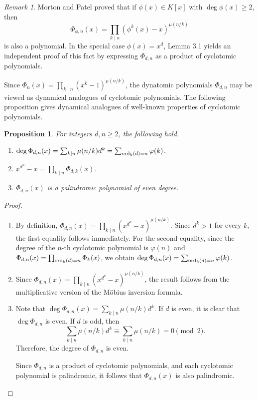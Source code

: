\documentclass[10pt,leqno]{amsart}
\newtheorem{proposition}[theorem]{Proposition}
\theoremstyle{definition}
\theoremstyle{remark}
\newtheorem{remark}[theorem]{Remark}
\numberwithin{equation}{section}
\def\ord{{\rm ord}}
\begin{document}
\begin{remark}
    Morton and Patel \cite[Theorem 2.5]{Morton94} proved that if $\phi(x)\in K[x]$ with $\deg\phi(x)\geq 2$, then 
    $$\Phi_{\phi,n}(x) = \prod_{k\mid n}(\phi^k(x)-x)^{\mu(n/k)}$$
    is also a polynomial. In the special case $\phi(x) = x^d$, Lemma 3.1 yields an independent proof of this fact by expressing $\Phi_{d,n}$ as a product of cyclotomic polynomials.
\end{remark}

Since $\Phi_n(x) = \prod_{k\mid n}(x^k-1)^{\mu(n/k)}$, the dynatomic polynomials $\Phi_{d,n}$ may be viewed as dynamical analogues of cyclotomic polynomials. The following proposition gives dynamical analogues of well-known properties of cyclotomic polynomials.

\begin{proposition}For integers $d,n\geq 2$, the following hold.
    \begin{enumerate}
        \item $\deg\Phi_{d,n}(x) = \sum_{k\mid n}\mu(n/k)d^k = \sum_{\ord_k(d) = n}\varphi(k)$.
        \item $x^{d^n}-x = \prod_{k\mid n}\Phi_{d,k}(x)$.
        \item $\Phi_{d,n}(x)$ is a palindromic polynomial of even degree.
    \end{enumerate}
\end{proposition}

\begin{proof}~
    \begin{enumerate}
        \item By definition, $\Phi_{d,n}(x) = \prod_{k\mid n}(x^{d^k}-x)^{\mu(n/k)}$. Since $d^k>1$ for every $k$, the first equality follows immediately. For the second equality, since the degree of the $n$-th cyclotomic polynomial is $\varphi(n)$ and $\Phi_{d,n}(x) = \prod_{\ord_k(d) = n}\Phi_k(x)$, we obtain $\deg \Phi_{d,n}(x) = \sum_{\ord_k(d) = n}\varphi(k)$.
        \item Since $\Phi_{d,n}(x) = \prod_{k\mid n}(x^{d^k}-x)^{\mu(n/k)}$, the result follows from the multiplicative version of the Möbius inversion formula.
        \item Note that $\deg\Phi_{d,n}(x) = \sum_{k\mid n}\mu(n/k)d^k$. If $d$ is even, it is clear that $\deg\Phi_{d,n}$ is even. If $d$ is odd, then
        $$\sum_{k\mid n}\mu(n/k)d^k\equiv \sum_{k\mid n}\mu(n/k) = 0\pmod 2.$$
        Therefore, the degree of $\Phi_{d,n}$ is even.

        Since $\Phi_{d,n}$ is a product of cyclotomic polynomials, and each cyclotomic polynomial is palindromic, it follows that $\Phi_{d,n}(x)$ is also palindromic.
    \end{enumerate}
\end{proof}
\end{document}
